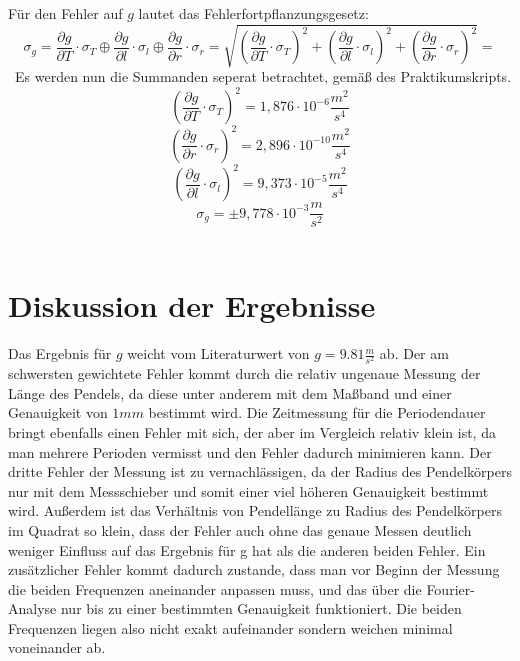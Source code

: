 \documentclass[a4paper, 11pt]{article}
\begin{document}
Für den Fehler auf $g$ lautet das Fehlerfortpflanzungsgesetz:
\begin{equation*}
\sigma_g = \frac{\partial g}{\partial T}\cdot\sigma_T \oplus \frac{\partial g}{\partial l}\cdot\sigma_l \oplus \frac{\partial g}{\partial r}\cdot\sigma_r = \sqrt{(\frac{\partial g}{\partial T}\cdot\sigma_T)^2 + (\frac{\partial g}{\partial l}\cdot\sigma_l)^2+( \frac{\partial g}{\partial r}\cdot\sigma_r)^2} = 
\end{equation*}\
Es werden nun die Summanden seperat betrachtet, gemäß des Praktikumskripts.
\begin{equation*}
(\frac{\partial g}{\partial T}\cdot\sigma_T)^2 = 1,876 \cdot 10^{-6} \frac{m^2}{s^4} 
\end{equation*}
\begin{equation*}
(\frac{\partial g}{\partial r}\cdot\sigma_r)^2 = 2,896 \cdot 10^{-10} \frac{m^2}{s^4} 
\end{equation*}
\begin{equation*}
(\frac{\partial g}{\partial l}\cdot\sigma_l)^2 = 9,373 \cdot 10^{-5} \frac{m^2}{s^4}
\end{equation*}
\begin{equation*}
\sigma_g = \pm9,778\cdot10^{-3} \frac{m}{s^2}
\end{equation*}\



\section{Diskussion der Ergebnisse}
Das Ergebnis für $g$ weicht vom Literaturwert von $g = 9.81 \frac{m}{s^2}$ ab. Der am schwersten gewichtete Fehler kommt durch die relativ ungenaue Messung der Länge des Pendels, da diese unter anderem mit dem Maßband und einer Genauigkeit von $1mm$ bestimmt wird. Die Zeitmessung für die Periodendauer bringt ebenfalls einen Fehler mit sich, der aber im Vergleich relativ klein ist, da man mehrere Perioden vermisst und den Fehler dadurch minimieren kann. Der dritte Fehler der Messung ist zu vernachlässigen, da der Radius des Pendelkörpers nur mit dem Messschieber und somit einer viel höheren Genauigkeit bestimmt wird. Außerdem ist das Verhältnis von Pendellänge zu Radius des Pendelkörpers im Quadrat so klein, dass der Fehler auch ohne das genaue Messen deutlich weniger Einfluss auf das Ergebnis für g hat als die anderen beiden Fehler. 
Ein zusätzlicher Fehler kommt dadurch zustande, dass man vor Beginn der Messung die beiden Frequenzen aneinander anpassen muss, und das über die Fourier-Analyse nur bis zu einer bestimmten Genauigkeit funktioniert. Die beiden Frequenzen liegen also nicht exakt aufeinander sondern weichen minimal voneinander ab.
\end{document}
